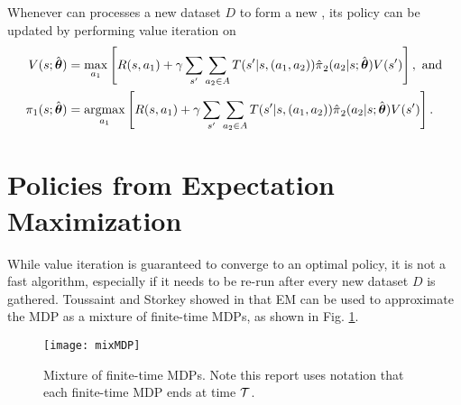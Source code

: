     Whenever  can processes a new dataset $D$ to form a new \estimate{\paramVec}, its policy can be updated by
    performing value iteration on
    \begin{equation}\label{eq:bellman_estim}
        \begin{aligned}
            V(s;\hat{\boldsymbol{\mathbb{\theta}}})
                &= \max_{a_1}\left[R(s,a_1) + \gamma\sum_{s'}\sum_{a_2\in A}T(s'|s,(a_1,a_2))
                    \hat{\pi_{}}_{2}(a_2|s;\hat{\boldsymbol{\mathbb{\theta}}}) V(s')\right],\ \text{and}\\
            \pi_{1}(s; \hat{\boldsymbol{\mathbb{\theta}}})
                &= \mathop{\mathrm{argmax}}_{a_1}\left[R(s,a_1) + \gamma\sum_{s'}\sum_{a_2\in A}T(s'|s,(a_1,a_2))
                    \hat{\pi_{}}_{2}(a_2|s;\hat{\boldsymbol{\mathbb{\theta}}})V(s')\right].
        \end{aligned}
    \end{equation}


\section{Policies from Expectation Maximization}\label{sec:EM}

    While value iteration is guaranteed to converge to an optimal policy, it is not a fast algorithm, especially if it
    needs to be re-run after every new dataset $D$ is gathered. Toussaint and Storkey showed in
    \cite{toussaint2010expectation} that \ac{EM} can be used to approximate the MDP as a mixture of finite-time MDPs, as
    shown in Fig. \ref{fig:mixMDP}.

    \begin{figure}
        \centering
        \texttt{[image: mixMDP]}
        \caption{Mixture of finite-time MDPs. Note this report uses notation that each finite-time MDP ends at time
                 $\mathcal{T}$.}
        \label{fig:mixMDP}
    \end{figure}


